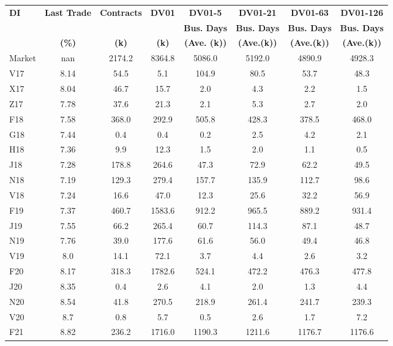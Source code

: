 \documentclass[article,crop=false]{standalone}%
\begin{document}
%
\normalsize%
\setlength{\tabcolsep}{0.15cm}%
\begin{tabular}[h]{l c c c c c c c}%
\hline%
\rowcolor{white}%
\textbf{DI}&\textbf{Last Trade}&\textbf{Contracts}&\textbf{DV01}&\textbf{DV01{-}5}&\textbf{DV01{-}21}&\textbf{DV01{-}63}&\textbf{DV01{-}126}\\%
\rowcolor{white}%
\textbf{}&\textbf{}&\textbf{}&\textbf{}&\textbf{Bus. Days}&\textbf{Bus. Days}&\textbf{Bus. Days}&\textbf{Bus. Days}\\%
\rowcolor{white}%
\textbf{}&\textbf{(\%)}&\textbf{(k)}&\textbf{(k)}&\textbf{(Ave. (k))}&\textbf{(Ave.(k))}&\textbf{(Ave.(k))}&\textbf{(Ave.(k))}\\%
\hline%
\rowcolor{gray}%
Market&nan&2174.2&8364.8&5086.0&5192.0&4890.9&4928.3\\%
\rowcolor{white}%
V17&8.14&54.5&5.1&104.9&80.5&53.7&48.3\\%
\rowcolor{lightgray}%
X17&8.04&46.7&15.7&2.0&4.3&2.2&1.5\\%
\rowcolor{white}%
Z17&7.78&37.6&21.3&2.1&5.3&2.7&2.0\\%
\rowcolor{lightgray}%
F18&7.58&368.0&292.9&505.8&428.3&378.5&468.0\\%
\rowcolor{white}%
G18&7.44&0.4&0.4&0.2&2.5&4.2&2.1\\%
\rowcolor{lightgray}%
H18&7.36&9.9&12.3&1.5&2.0&1.1&0.5\\%
\rowcolor{white}%
J18&7.28&178.8&264.6&47.3&72.9&62.2&49.5\\%
\rowcolor{lightgray}%
N18&7.19&129.3&279.4&157.7&135.9&112.7&98.6\\%
\rowcolor{white}%
V18&7.24&16.6&47.0&12.3&25.6&32.2&56.9\\%
\rowcolor{lightgray}%
F19&7.37&460.7&1583.6&912.2&965.5&889.2&931.4\\%
\rowcolor{white}%
J19&7.55&66.2&265.4&60.7&114.3&87.1&48.7\\%
\rowcolor{lightgray}%
N19&7.76&39.0&177.6&61.6&56.0&49.4&46.8\\%
\rowcolor{white}%
V19&8.0&14.1&72.1&3.7&4.4&2.6&3.2\\%
\rowcolor{lightgray}%
F20&8.17&318.3&1782.6&524.1&472.2&476.3&477.8\\%
\rowcolor{white}%
J20&8.35&0.4&2.6&4.1&2.0&1.3&4.4\\%
\rowcolor{lightgray}%
N20&8.54&41.8&270.5&218.9&261.4&241.7&239.3\\%
\rowcolor{white}%
V20&8.7&0.8&5.7&0.5&2.6&1.7&7.2\\%
\rowcolor{lightgray}%
F21&8.82&236.2&1716.0&1190.3&1211.6&1176.7&1176.6\\%

\end{tabular}
\end{document}
